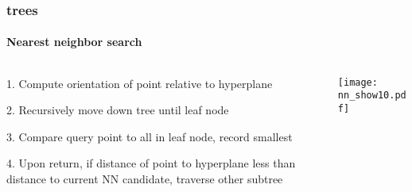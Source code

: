\begin{frame}[noframenumbering]
  \frametitle{\kd trees}
  \framesubtitle{Nearest neighbor search}
  \begin{columns}[T]
    \begin{column}{.5\textwidth}
      \begin{block}{}%
        {\color{white} 1.\hspace{1mm} Compute orientation of point relative to hyperplane
          \\\vspace{0.4cm}
        
        2.\hspace{1mm} Recursively move down tree until leaf node\\\vspace{0.4cm}

        3.\hspace{1mm} Compare query point to all in leaf node, record smallest\\\vspace{0.4cm}
    
        {\color{graph-red}
        4.\hspace{1mm} Upon return, if distance of point to hyperplane less than distance to current
      NN candidate, traverse other subtree}}
      \end{block}
    \end{column}
    \begin{column}{.5\textwidth}
      \begin{block}{}
        \texttt{[image: nn\_show10.pdf]}
      \end{block}
    \end{column}
  \end{columns}
\end{frame}

